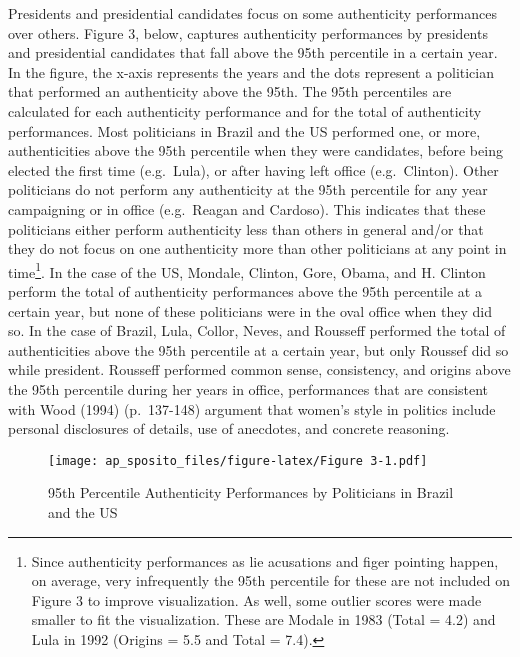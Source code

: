 \documentclass[
  12pt,
]{article}
\begin{document}
Presidents and presidential candidates focus on some authenticity
performances over others. Figure 3, below, captures authenticity
performances by presidents and presidential candidates that fall above
the 95th percentile in a certain year. In the figure, the x-axis
represents the years and the dots represent a politician that performed
an authenticity above the 95th. The 95th percentiles are calculated for
each authenticity performance and for the total of authenticity
performances. Most politicians in Brazil and the US performed one, or
more, authenticities above the 95th percentile when they were
candidates, before being elected the first time (e.g.~Lula), or after
having left office (e.g.~Clinton). Other politicians do not perform any
authenticity at the 95th percentile for any year campaigning or in
office (e.g.~Reagan and Cardoso). This indicates that these politicians
either perform authenticity less than others in general and/or that they
do not focus on one authenticity more than other politicians at any
point in time\footnote{ Since authenticity performances as lie
  acusations and figer pointing happen, on average, very infrequently
  the 95th percentile for these are not included on Figure 3 to improve
  visualization. As well, some outlier scores were made smaller to fit
  the visualization. These are Modale in 1983 (Total = 4.2) and Lula in
  1992 (Origins = 5.5 and Total = 7.4).}. In the case of the US,
Mondale, Clinton, Gore, Obama, and H. Clinton perform the total of
authenticity performances above the 95th percentile at a certain year,
but none of these politicians were in the oval office when they did so.
In the case of Brazil, Lula, Collor, Neves, and Rousseff performed the
total of authenticities above the 95th percentile at a certain year, but
only Roussef did so while president. Rousseff performed common sense,
consistency, and origins above the 95th percentile during her years in
office, performances that are consistent with Wood (1994) (p.~137-148)
argument that women's style in politics include personal disclosures of
details, use of anecdotes, and concrete reasoning.

\begin{figure}
\centering
\texttt{[image: ap\_sposito\_files/figure-latex/Figure 3-1.pdf]}
\caption{95th Percentile Authenticity Performances by Politicians in
Brazil and the US}
\end{figure}
\end{document}
